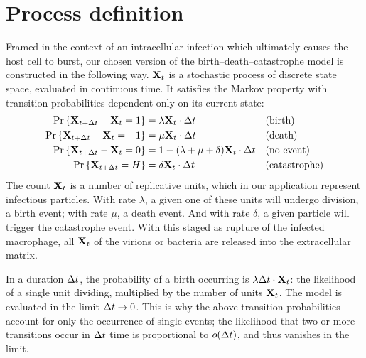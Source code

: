 \section{Process definition}
\label{sec:process_definition}

Framed in the context of an intracellular infection which ultimately causes the
host cell to burst, our chosen version of the birth--death--catastrophe model
is constructed in the following way. ${{\bf X}_t}$ is a stochastic process of discrete
state space, evaluated in continuous time. It satisfies the Markov property
with transition probabilities dependent only on its current state:
\begin{align*}
{\text{Pr}\left\{{\bf X}_{t+\Delta t} - {{\bf X}_t}= 1\right\}} &= \lambda {{\bf X}_t} \cdot \Delta t&&\text{(birth)}\\
{\text{Pr}\left\{{\bf X}_{t+\Delta t} - {{\bf X}_t} = -1\right\}} &= \mu {{\bf X}_t}  \cdot \Delta t&&\text{(death)}\\
{\text{Pr}\left\{{\bf X}_{t+\Delta t} - {{\bf X}_t} = 0\right\}} &=1 -  (\lambda+\mu+\delta) {{\bf X}_t}  \cdot \Delta t&&\text{(no event)}\\
{\text{Pr}\left\{{\bf X}_{t+\Delta t} = H\right\}} &=\delta {{\bf X}_t}  \cdot \Delta t&&\text{(catastrophe)}
\end{align*}
The count ${{\bf X}_t}$ is a number of replicative units, which in our application
represent infectious particles. With rate $\lambda$, a given one of these units
will undergo division, a birth event; with rate $\mu$, a death event. And with
rate $\delta$, a given particle will trigger the catastrophe event. With this
staged as rupture of the infected macrophage, all ${{\bf X}_t}$ of the virions or
bacteria are released into the extracellular matrix.

In a duration $\Delta t$, the probability of a birth occurring is
$\lambda \Delta t \cdot {{\bf X}_t}$: the likelihood of a single unit dividing, multiplied
by the number of units ${{\bf X}_t}$. The model is evaluated in the limit
$\Delta t \to 0$. This is why the above transition probabilities account for only
the occurrence of single events; the likelihood that two or more transitions
occur in $\Delta t$ time is proportional to $o(\Delta t)$, and thus vanishes in the
limit.



